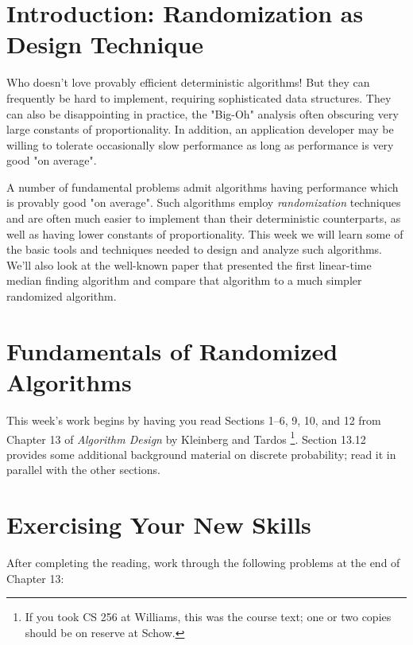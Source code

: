 \documentclass[11pt]{article}
\begin{document}
\section{Introduction: Randomization as Design Technique}
Who doesn't love provably efficient deterministic algorithms! But they can frequently be hard to implement, requiring sophisticated data structures. They can also be disappointing in practice, the "Big-Oh" analysis often obscuring very large constants of proportionality. In addition, an application developer may be willing to tolerate occasionally slow performance as long as performance is very good "on average".

A number of fundamental problems admit algorithms having performance which is provably good "on average". Such algorithms employ {\em randomization} techniques and are often much easier to implement than their deterministic counterparts, as well as having lower constants of proportionality.  This week we will learn some of the basic tools and techniques needed to design and analyze such algorithms. We'll also look at the well-known paper that presented the first linear-time median finding algorithm and compare that algorithm to a much simpler randomized algorithm.

\section{Fundamentals of Randomized Algorithms}
This week's work begins by having you read Sections 1--6, 9, 10, and 12 from Chapter 13 of {\em Algorithm Design} by Kleinberg and Tardos
\footnote{If you took CS 256 at Williams, this was the course text; one or two copies should be on reserve at Schow.}.
Section 13.12 provides some additional background material on discrete probability; read it in parallel with the other sections.

\section{Exercising Your New Skills}
After completing the reading, work through the following problems at the end of Chapter 13:
\end{document}
